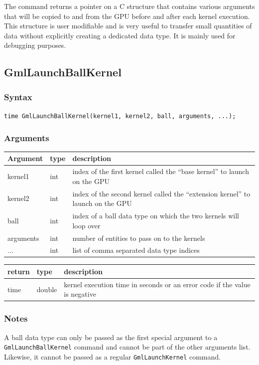 \documentclass[a4paper,12pt]{article}
\begin{document}
The command returns a pointer on a C structure that contains various arguments that will be copied to and from the GPU before and after each kernel execution. This structure is user modifiable and is very useful to transfer small quantities of data without explicitly creating a dedicated data type. It is mainly used for debugging purposes.

\subsection{GmlLaunchBallKernel}
\subsubsection*{Syntax}
{\tt time GmlLaunchBallKernel(kernel1, kernel2, ball, arguments, ...);}
\subsubsection*{Arguments}

\begin{tabular}{|m{2cm}|m{1.5cm}|m{10.5cm}|}
\hline
Argument   & type   & description \\
\hline
kernel1    & int   & index of the first kernel called the ``base kernel'' to launch on the GPU \\
\hline
kernel2    & int   & index of the second kernel called the ``extension kernel'' to launch on the GPU \\
\hline
ball       & int   & index of a ball data type on which the two kernels will loop over \\
\hline
arguments  & int   & number of entities to pass on to the kernels \\
\hline
...        & int   & list of comma separated data type indices \\
\hline
\end{tabular}

\medskip

\begin{tabular}{|m{2cm}|m{1.5cm}|m{10.5cm}|}
\hline
return     & type   & description \\
\hline
time       & double & kernel execution time in seconds or an error code if the value is negative \\
\hline
\end{tabular}
 
\subsubsection*{Notes}
A ball data type can only be passed as the first special argument to a {\tt GmlLaunchBallKernel} command and cannot be part of the other arguments list. Likewise, it cannot be passed as a regular {\tt GmlLaunchKernel} command.
\end{document}
